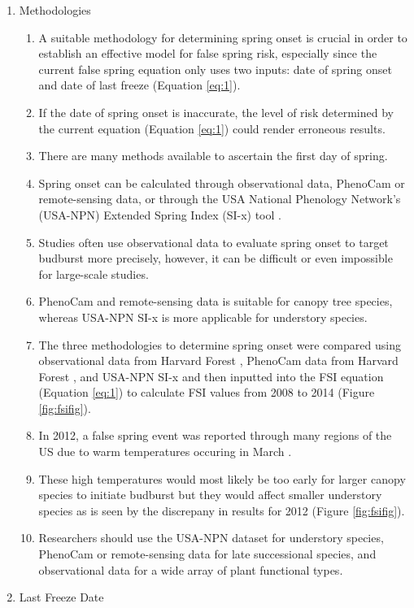 \documentclass{article}\usepackage[]{graphicx}\usepackage[]{color}
\begin{document}
\begin{enumerate}
\item Methodologies
\begin{enumerate}
\item A suitable methodology for determining spring onset is crucial in order to establish an effective model for false spring risk, especially since the current false spring equation only uses two inputs: date of spring onset and date of last freeze (Equation \ref{eq:1}). 
\item If the date of spring onset is inaccurate, the level of risk determined by the current equation (Equation \ref{eq:1}) could render erroneous results. 
\item There are many methods available to ascertain the first day of spring.
\item Spring onset can be calculated through observational data, PhenoCam or remote-sensing data, or through the USA National Phenology Network's (USA-NPN) Extended Spring Index (SI-x) tool \citep{USA-NPN2016}.
\item Studies often use observational data to evaluate spring onset to target budburst more precisely, however, it can be difficult or even impossible for large-scale studies. 
\item PhenoCam and remote-sensing data is suitable for canopy tree species, whereas USA-NPN SI-x is more applicable for understory species. 
\item The three methodologies to determine spring onset were compared using observational data from Harvard Forest \citep{Okeefe2014}, PhenoCam data from Harvard Forest \citep{Richardson2015}, and USA-NPN SI-x \citep{USA-NPN2016} and then inputted into the FSI equation (Equation \ref{eq:1}) to calculate FSI values from 2008 to 2014 (Figure \ref{fig:fsifig}).
\item In 2012, a false spring event was reported through many regions of the US due to warm temperatures occuring in March \citep{Ault2015}.
\item These high temperatures would most likely be too early for larger canopy species to initiate budburst but they would affect smaller understory species as is seen by the discrepany in results for 2012 (Figure \ref{fig:fsifig}).
\item Researchers should use the USA-NPN dataset for understory species, PhenoCam or remote-sensing data for late successional species, and observational data for a wide array of plant functional types.
\end{enumerate}
\item Last Freeze Date

\end{enumerate}
\end{document}
